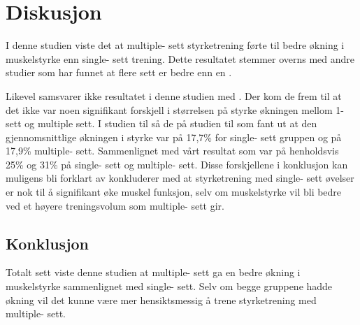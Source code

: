 \documentclass[
]{book}
\begin{document}
\hypertarget{diskusjon}{%
\section{Diskusjon}\label{diskusjon}}

I denne studien viste det at multiple- sett styrketrening førte til bedre økning i muskelstyrke enn single- sett trening. Dette resultatet stemmer overns med andre studier som har funnet at flere sett er bedre enn en \citep{galvão2005e, humburg2007c}.

Likevel samsvarer ikke resultatet i denne studien med \citep{carpinelli1998d}. Der kom de frem til at det ikke var noen signifikant forskjell i størrelsen på styrke økningen mellom 1- sett og multiple sett. I studien til \citep{carpinelli1998b} så de på studien til \citep{reid1987a} som fant ut at den gjennomsnittlige økningen i styrke var på 17,7\% for single- sett gruppen og på 17,9\% multiple- sett. Sammenlignet med vårt resultat som var på henholdsvis 25\% og 31\% på single- sett og multiple- sett. Disse forskjellene i konklusjon kan muligens bli forklart av \citep{galvão2005d} konkluderer med at styrketrening med single- sett øvelser er nok til å signifikant øke muskel funksjon, selv om muskelstyrke vil bli bedre ved et høyere treningsvolum som multiple- sett gir.

\hypertarget{konklusjon}{%
\subsection{Konklusjon}\label{konklusjon}}

Totalt sett viste denne studien at multiple- sett ga en bedre økning i muskelstyrke sammenlignet med single- sett. Selv om begge gruppene hadde økning vil det kunne være mer hensiktsmessig å trene styrketrening med multiple- sett.

  
\end{document}
